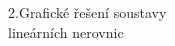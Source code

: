 \documentclass[preview]{standalone}
\begin{document}
\begin{center}
\centering 2.Grafické řešení soustavy\\ lineárních nerovnic
\end{center}
\end{document}
